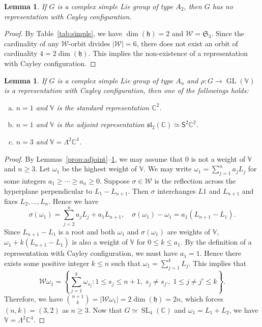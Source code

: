 \documentclass[11pt,reqno]{amsart}
\DeclareMathOperator{\GL}{GL}
\DeclareMathOperator{\SL}{SL}
\newtheorem{lemma}[theorem]{Lemma}
\newcommand{\W}{\mathcal{W}}
\begin{document}
\begin{lemma}\label{lem:A_2}
If $G$ is a complex simple Lie group of type $A_2$,  then $G$ has no representation with Cayley configuration.
\end{lemma}
\begin{proof}
By Table~\ref{tab:simple},  we have $\dim (\mathfrak{h})= 2$ and $\W = \mathfrak{S}_3$. Since the cardinality of any $\W$-orbit divides $|\W| = 6$,  there does not exist an orbit of cardinality $4 = 2 \dim (\mathfrak{h})$.  This implies the non-existence of a representation with Cayley configuration.  
\end{proof}

\begin{lemma}\label{lem:An}
If $G$ is a complex simple Lie group of type $A_n$ and $\rho: G \to \GL (\mathbb{V})$ is a representation with Cayley configuration,  then one of the followings holds: 
\begin{enumerate}[(a)]
\item $n = 1$ and $\mathbb{V}$ is the standard representation $\mathbb{C}^2$. 
\item $n = 1$ and $\mathbb{V}$ is the adjoint representation $\mathfrak{sl}_2(\mathbb{C})\simeq \mathsf{S}^2 \mathbb{C}^2$.  
\item $n =3$ and $\mathbb{V} = \mathsf{\Lambda}^2 \mathbb{C}^4$.
\end{enumerate}
\end{lemma}
\begin{proof}
By Lemmas~\ref{prop:adjoint}--\ref{lem:A_2},  we may assume that $0$ is not a weight of $\mathbb{V}$ and $n \ge 3$.  Let $\omega_1$ be the highest weight of $\mathbb{V}$.  We may write $\omega_1 = \sum_{j=1}^n a_j L_j$ for some integers $a_1 \ge \cdots \ge a_n \ge 0$.  Suppose $\sigma \in \W$ is the reflection across the hyperplane perpendicular to $L_1 - L_{n+1}$.  Then $\sigma$ interchanges $L1$ and $L_{n+1}$ and fixes $L_2,\dots, L_n$.  Hence we have 
\[
\sigma (\omega_1) = \sum_{j=2}^{n} a_j L_j + a_1 L_{n+1},\quad \sigma(\omega_1) - \omega_1 = a_1 (L_{n+1} - L_1).
\] 
Since $L_{n+1} - L_1$ is a root and both $\omega_1$ and $\sigma(\omega_1)$ are weights of $\mathbb{V}$,  $\omega_1 + k (L_{n+1} - L_1)$ is also a weight of $\mathbb{V}$ for $0 \le k \le a_1$.  By the definition of a representation with Cayley configuration,  we must have $a_1 = 1$.  Hence there exists some positive integer $k \le n$ such that $\omega_1 = \sum_{j=1}^k L_j$.  This implies that 
\[
\W \omega_1 = \left\lbrace \sum_{j=1}^k \omega_{s_j}: 1 \le s_j \le n+1,\;s_j \ne s_{j'},\;1 \le j \ne j' \le k\right\rbrace.
\]
Therefore,  we have $\binom{n+1}{k} = |\W \omega_1| = 2 \dim(\mathfrak{h}) = 2n$,  which forces $(n,k) = (3,2)$ as $n \ge 3$.  Now that $G \simeq \SL_4(\mathbb{C})$ and $\omega_1 = L_1 + L_2$,  we have $\mathbb{V} = \mathsf{\Lambda}^2 \mathbb{C}^4$.
\end{proof}
\end{document}

